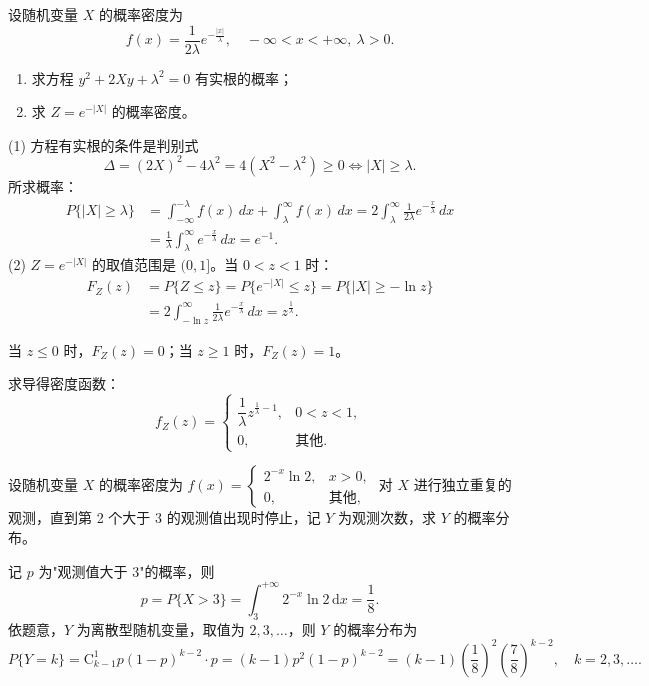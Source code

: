 ﻿\documentclass[lang=cn,11pt]{elegantbook}
\begin{document}
\begin{exercise}[拉普拉斯分布变换] 
设随机变量 $X$ 的概率密度为
\[
f(x)=\frac{1}{2\lambda}e^{-\frac{|x|}{\lambda}},\quad -\infty<x<+\infty,\ \lambda>0.
\]
\begin{enumerate}
    \item[(1)] 求方程 $y^2+2Xy+\lambda^2=0$ 有实根的概率；
    \item[(2)] 求 $Z=e^{-|X|}$ 的概率密度。
\end{enumerate}
\end{exercise}
\begin{solution}
(1) 方程有实根的条件是判别式
\[
\Delta = (2X)^2 - 4\lambda^2 = 4(X^2-\lambda^2) \geqslant 0 \Leftrightarrow |X|\geqslant\lambda.
\]
所求概率：
\[
\begin{aligned}
P\{|X|\geqslant\lambda\} &= \int_{-\infty}^{-\lambda} f(x)\,dx + \int_{\lambda}^{\infty} f(x)\,dx = 2\int_{\lambda}^{\infty} \frac{1}{2\lambda}e^{-\frac{x}{\lambda}}\,dx \\
&= \frac{1}{\lambda}\int_{\lambda}^{\infty} e^{-\frac{x}{\lambda}}\,dx = e^{-1}.
\end{aligned}
\]
(2) $Z=e^{-|X|}$ 的取值范围是 $(0,1]$。当 $0<z<1$ 时：
\[
\begin{aligned}
F_Z(z) &= P\{Z\leqslant z\} = P\{e^{-|X|}\leqslant z\} = P\{|X|\geqslant -\ln z\} \\
&= 2\int_{-\ln z}^{\infty} \frac{1}{2\lambda}e^{-\frac{x}{\lambda}}\,dx = z^{\frac{1}{\lambda}}.
\end{aligned}
\]

当 $z\leqslant0$ 时，$F_Z(z)=0$；当 $z\geqslant1$ 时，$F_Z(z)=1$。

求导得密度函数：
\[
f_Z(z) =
\begin{cases}
\dfrac{1}{\lambda}z^{\frac{1}{\lambda}-1}, & 0<z<1, \\[6pt]
0, & \text{其他}.
\end{cases}
\]
\end{solution}



\begin{exercise}\label{exer:2-14}
设随机变量 $X$ 的概率密度为 $f(x) = \begin{cases} 2^{-x}\ln 2, & x > 0, \\ 0, & \text{其他}, \end{cases}$ 对 $X$ 进行独立重复的观测，直到第 2 个大于 3 的观测值出现时停止，记 $Y$ 为观测次数，求 $Y$ 的概率分布。
\end{exercise}

\begin{solution}
记 $p$ 为"观测值大于 3"的概率，则
\[
p = P\{X > 3\} = \int_3^{+\infty} 2^{-x}\ln 2\,\mathrm{d}x = \frac{1}{8}.
\]
依题意，$Y$ 为离散型随机变量，取值为 $2,3,\dots$，则 $Y$ 的概率分布为
\[
P\{Y=k\} = \mathrm{C}_{k-1}^1 p(1-p)^{k-2} \cdot p = (k-1)p^2(1-p)^{k-2} = (k-1)\left(\frac{1}{8}\right)^2\left(\frac{7}{8}\right)^{k-2},\quad k=2,3,\dots.
\]
\end{solution}
\end{document}
